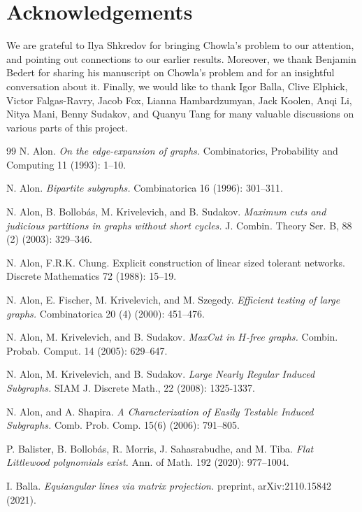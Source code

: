 \documentclass[11pt]{article}
\theoremstyle{plain}
\theoremstyle{definition}
\begin{document}
\section*{Acknowledgements}
We are grateful to Ilya Shkredov for bringing Chowla's problem to our attention, and pointing out connections to our earlier results. Moreover, we thank Benjamin Bedert for sharing his manuscript on Chowla's problem and for an insightful conversation about it. Finally, we would like to thank Igor Balla, Clive Elphick, Victor Falgas-Ravry, Jacob Fox,
Lianna Hambardzumyan, Jack Koolen, Anqi Li, Nitya Mani, Benny Sudakov, and  Quanyu Tang  for many valuable discussions on various parts of this project.

\begin{thebibliography}{99}
N. Alon.
\emph{On the edge-expansion of graphs.}
Combinatorics, Probability and Computing 11 (1993): 1--10.

N. Alon.
\emph{Bipartite subgraphs.}
Combinatorica 16 (1996): 301--311.

N. Alon, B. Bollob\'as, M. Krivelevich, and B. Sudakov.
\emph{Maximum cuts and judicious partitions in graphs without short cycles.}
J. Combin. Theory Ser. B, 88 (2) (2003): 329--346.

 N. Alon, F.R.K. Chung. Explicit construction of linear sized tolerant networks.
Discrete Mathematics 72 (1988): 15--19.

N. Alon, E. Fischer, M. Krivelevich, and M. Szegedy.
\emph{Efficient testing of large graphs.}
Combinatorica 20 (4) (2000): 451--476.

N. Alon, M. Krivelevich, and B. Sudakov.
\emph{MaxCut in $H$-free graphs.}
Combin. Probab. Comput. 14 (2005): 629--647.

N. Alon, M. Krivelevich, and B. Sudakov.
\emph{Large Nearly Regular Induced Subgraphs.}
SIAM J. Discrete Math., 22 (2008): 1325-1337.

N. Alon, and A. Shapira. 
\emph{A Characterization of Easily Testable Induced Subgraphs.}
Comb. Prob. Comp. 15(6) (2006): 791--805.

P. Balister, B. Bollob\'as, R. Morris, J. Sahasrabudhe, and M. Tiba.
\emph{Flat Littlewood polynomials exist.}
Ann. of Math. 192 (2020): 977--1004.

I. Balla.
\emph{Equiangular lines via matrix projection.}
preprint, arXiv:2110.15842 (2021).


\end{thebibliography}
\end{document}
